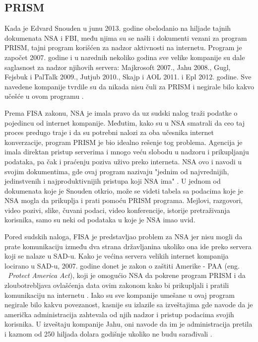 \documentclass[a4paper]{article}
\begin{document}
\subsection{PRISM}
\label{subsec:prism}
Kada je Edvard Snouden u junu 2013. godine obelodanio na hiljade tajnih dokumenata NSA i FBI, među njima su se našli i dokumenti vezani za program PRISM, tajni program korišćen za nadzor aktivnosti na internetu. Program je započet 2007. godine i u narednih nekoliko godina sve velike kompanije su dale saglasnost za nadzor njihovih servera: Majkrosoft 2007., Jahu 2008.,  Gugl, Fejsbuk i PalTalk 2009.,  Jutjub 2010., Skajp i AOL 2011. i Epl 2012. godine. Sve navedene kompanije tvrdile su da nikada nisu čuli za PRISM i negirale bilo kakvo učešće u ovom programu \cite{prism}. 
\par Prema FISA zakonu, NSA je imala pravo da uz sudski nalog traži podatke o pojedincu od internet kompanije. Međutim, kako su u NSA smatrali da ceo taj proces predugo traje i da su potrebni nalozi za oba učesnika internet konverzacije, program PRISM je bio idealno rešenje tog problema. Agencija je imala direktan pristup serverima i  mnogo veću slobodu u nadzoru i prikupljanju podataka, pa čak i praćenju poziva uživo preko interneta. NSA ovo i navodi u svojim dokumentima, gde ovaj program nazivaju "jednim od najvrednijih, jedinstvenih i najproduktivnijih pristupa koji NSA ima" \cite{prism}. U jednom od dokumenata koje je Snouden otkrio, može se videti tabela sa podacima koje je NSA mogla da prikuplja i prati pomoću PRISM programa. Mejlovi, razgovori, video pozivi, slike, čuvani podaci, video konferencije, istorije pretraživanja korisnika, samo su neki od podataka u koje je NSA imao uvid.
\par Pored sudskih naloga, FISA je predstavljao problem za NSA jer nisu mogli da prate komunikaciju između dva strana državljanina ukoliko ona ide preko servera koji se nalaze u SAD-u. Kako je većina servera velikih internet kompanija locirano u SAD-u, 2007. godine donet je zakon o zaštiti Amerike - PAA (eng. ~{\em Protect America Act}), koji je omogućio NSA da pokrene program PRISM i da zloubotrebljava ovlašćenja data ovim zakonom kako bi prikupljali i pratili komunikaciju na internetu \cite{prism1}. Iako su sve kompanije umešane u ovaj program negirale bilo kakvu povezanost, kasnije su izlazile sa izveštajima gde navode da je američka administracija zahtevala od njih nadzor i pristup podacima svojih korisnika. U izveštaju kompanije Jahu, oni navode da im je administracija pretila i kaznom od 250 hiljada dolara godišnje ukoliko ne budu sarađivali \cite{prism2}. 
\end{document}
